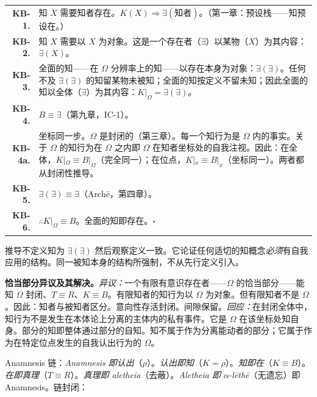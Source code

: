 \documentclass[10pt, openany, oneside]{book}
\renewcommand{\footnotesize}{\fontsize{8.5}{11}\selectfont}
\begin{document}
{\footnotesize
\noindent\begin{tabular}{r p{}}
\textbf{KB-1.} & 知 $X$ 需要知者存在。$K(X) \Rightarrow \exists(\text{知者})$。（第一章：预设栈——知预设在。）\\[0.3em]
\textbf{KB-2.} & 知 $X$ 需要以 $X$ 为对象。这是一个存在者（$\exists$）以某物（$X$）为其内容：$\exists(X)$。\\[0.3em]
\textbf{KB-3.} & 全面的知——在 $\Omega$ 分辨率上的知——以存在本身为对象：$\exists(\exists)$。任何不及 $\exists(\exists)$ 的知留某物未被知；全面的知按定义不留未知；因此全面的知以全体（$\exists$）为其内容：$K|_{\Omega} = \exists(\exists)$。\\[0.3em]
\textbf{KB-4.} & $B \equiv \exists$（第九章，IC-1）。\\[0.3em]
\textbf{KB-4a.} & \textsc{坐标同一步。}$\Omega$ 是封闭的（第三章）。每一个知行为是 $\Omega$ 内的事实。关于 $\Omega$ 的知行为在 $\Omega$ 之内即 $\Omega$ 在知者坐标处的自我注视。因此：在全体，$K|_\Omega \equiv B|_\Omega$（完全同一）；在位点，$K|_x \equiv B|_x$（坐标同一）。两者都从封闭性推导。\\[0.3em]
\textbf{KB-5.} & $\exists(\exists) \equiv \exists$（Arch\={e}，第四章）。\\[0.3em]
\textbf{KB-6.} & $\therefore K|_{\Omega} \equiv B$。全面的知即存在。$\square$ \\[0.3em]
\end{tabular}
}

\vspace{0.8em}

\noindent 推导不定义知为 $\exists(\exists)$ 然后观察定义一致。它论证任何适切的知概念\textit{必须}有自我应用的结构。同一被知本身的结构所强制，不从先行定义引入。

\textbf{恰当部分异议及其解决。}\textit{异议：}一个有限有意识存在者——$\Omega$ 的恰当部分——能知 $\Omega$ 封闭、$T \equiv R$、$K \equiv B$。有限知者的知行为以 $\Omega$ 为对象。但有限知者不是 $\Omega$。因此：知者与被知者区分。意向性存活封闭。间隙保留。\textit{回应：}在封闭全体中，知行为不是发生在本体论上分离的主体内的私有事件。它是 $\Omega$ 在该坐标处知自身。部分的知即整体通过部分的自知。知不属于作为分离能动者的部分；它属于作为在特定位点发生的自我认出行为的 $\Omega$。

Anamnesis 链：\textit{Anamnesis 即认出}（$\rho$）。\textit{认出即知}（$K = \rho$）。\textit{知即在}（$K \equiv B$）。\textit{在即真理}（$T \equiv R$）。\textit{真理即 aletheia}（去蔽）。\textit{Aletheia 即} $\alpha$-\textit{l\={e}th\={e}}（无遗忘）即 Anamnesis。链封闭：
\end{document}
